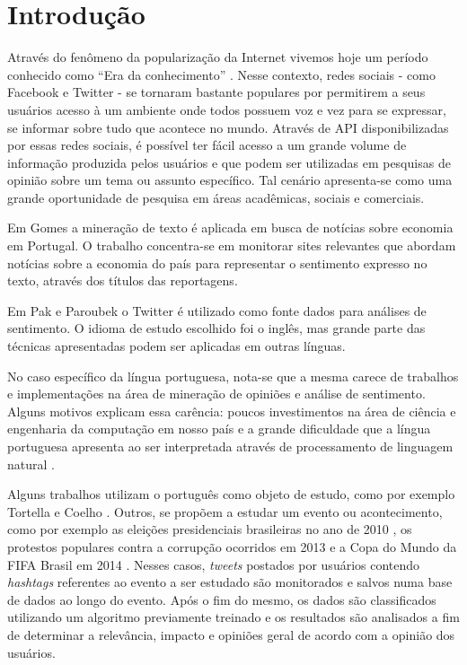\chapter{Introdução} \label{cap:1}

Através do fenômeno da popularização da Internet vivemos hoje um período conhecido como \enquote{Era da conhecimento} \cite{lastres1999informaccao}.
Nesse contexto, redes sociais - como Facebook e Twitter - se tornaram bastante populares por permitirem a seus usuários acesso à um ambiente onde todos possuem voz e vez para se expressar, se informar sobre tudo que acontece no mundo.
Através de \ac{API} disponibilizadas por essas redes sociais, é possível ter fácil acesso a um grande volume de informação produzida pelos usuários e que podem ser utilizadas em pesquisas de opinião sobre um tema ou assunto específico. Tal cenário apresenta-se como uma grande oportunidade de pesquisa em áreas acadêmicas, sociais e comerciais.

Em Gomes \cite{gomes2013text} a mineração de texto é aplicada em busca de notícias sobre economia em Portugal. O trabalho concentra-se em monitorar sites relevantes que abordam notícias sobre a economia do país para representar o sentimento expresso no texto, através dos títulos das reportagens.

Em Pak e Paroubek \cite{pak2010twitter} o Twitter é utilizado como fonte dados para análises de sentimento. O idioma de estudo escolhido foi o inglês, mas grande parte das técnicas apresentadas podem ser aplicadas em outras línguas.

No caso específico da língua portuguesa, nota-se que a mesma carece de trabalhos e implementações na área de mineração de opiniões e análise de sentimento. Alguns motivos explicam essa carência: poucos investimentos na área de ciência e engenharia da computação em nosso país e a grande dificuldade que a língua portuguesa apresenta ao ser interpretada através de processamento de linguagem natural \cite{santos2000projecto}.

Alguns trabalhos utilizam o português como objeto de estudo, como por exemplo Tortella e Coelho \cite{tortellaanalise}. Outros, se propõem a estudar um evento ou acontecimento, como por exemplo as eleições presidenciais brasileiras no ano de 2010 \cite{rodrigues2012characterizing}, os protestos populares contra a corrupção ocorridos em 2013 \cite{franca2014analise} e a Copa do Mundo da FIFA Brasil em 2014 \cite{carvalho2014mineraccao}. Nesses casos, \textit{tweets} postados por usuários contendo \textit{hashtags} referentes ao evento a ser estudado são monitorados e salvos numa base de dados ao longo do evento. Após o fim do mesmo, os dados são classificados utilizando um algoritmo previamente treinado e os resultados são analisados a fim de determinar a relevância, impacto e opiniões geral de acordo com a opinião dos usuários.

